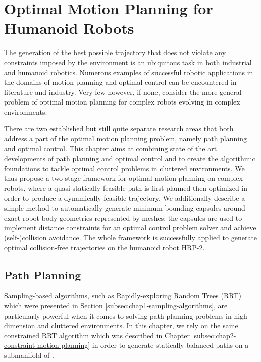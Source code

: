 \chapter{Optimal Motion Planning for Humanoid Robots}
\label{chap:optimal-motion-planning}

The generation of the best possible trajectory that does not violate
any constraints imposed by the environment is an ubiquitous task in
both industrial and humanoid robotics. Numerous examples of successful
robotic applications in the domains of motion planning and optimal
control can be encountered in literature and industry. Very few
however, if none, consider the more general problem of optimal motion
planning for complex robots evolving in complex environments.

There are two established but still quite separate research areas that
both address a part of the optimal motion planning problem, namely
path planning and optimal control. This chapter aims at combining
state of the art developments of path planning and optimal control and
to create the algorithmic foundations to tackle optimal control
problems in cluttered environments. We thus propose a two-stage
framework for optimal motion planning on complex robots, where a
quasi-statically feasible path is first planned then optimized in
order to produce a dynamically feasible trajectory. We additionally
describe a simple method to automatically generate minimum bounding
capsules around exact robot body geometries represented by meshes; the
capsules are used to implement distance constraints for an optimal
control problem solver and achieve (self-)collision avoidance. The
whole framework is successfully applied to generate optimal
collision-free trajectories on the humanoid robot HRP-2.

\section{Path Planning}

Sampling-based algorithms, such as Rapidly-exploring Random Trees
(RRT) which were presented in Section
\ref{subsec:chap1-sampling-algorithms}, are particularly powerful when
it comes to solving path planning problems in
high-dimension \cspace\thinspace and cluttered environments. In this
chapter, we rely on the same constrained RRT algorithm which was
described in Chapter \ref{subsec:chap2-constraint-motion-planning} in
order to generate statically balanced paths on a submanifold
of \cspace.

